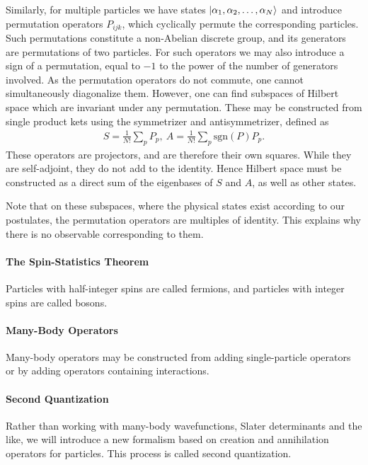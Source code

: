 Similarly, for multiple particles we have states $\ket{\alpha_{1}, \alpha_{2}, \dots, \alpha_{N}}$ and introduce permutation operators $P_{ijk}$, which cyclically permute the corresponding particles. Such permutations constitute a non-Abelian discrete group, and its generators are permutations of two particles. For such operators we may also introduce a sign of a permutation, equal to $-1$ to the power of the number of generators involved. As the permutation operators do not commute, one cannot simultaneously diagonalize them. However, one can find subspaces of Hilbert space which are invariant under any permutation. These may be constructed from single product kets using the symmetrizer and antisymmetrizer, defined as
\begin{align*}
	S = \frac{1}{N!}\sum\limits_{p}P_{p},\ A = \frac{1}{N!}\sum\limits_{p}\text{sgn}(P)P_{p}.
\end{align*}
These operators are projectors, and are therefore their own squares. While they are self-adjoint, they do not add to the identity. Hence Hilbert space must be constructed as a direct sum of the eigenbases of $S$ and $A$, as well as other states.

Note that on these subspaces, where the physical states exist according to our postulates, the permutation operators are multiples of identity. This explains why there is no observable corresponding to them.

\paragraph{The Spin-Statistics Theorem}
Particles with half-integer spins are called fermions, and particles with integer spins are called bosons.

\paragraph{Many-Body Operators}
Many-body operators may be constructed from adding single-particle operators or by adding operators containing interactions.

\paragraph{Second Quantization}
Rather than working with many-body wavefunctions, Slater determinants and the like, we will introduce a new formalism based on creation and annihilation operators for particles. This process is called second quantization.

